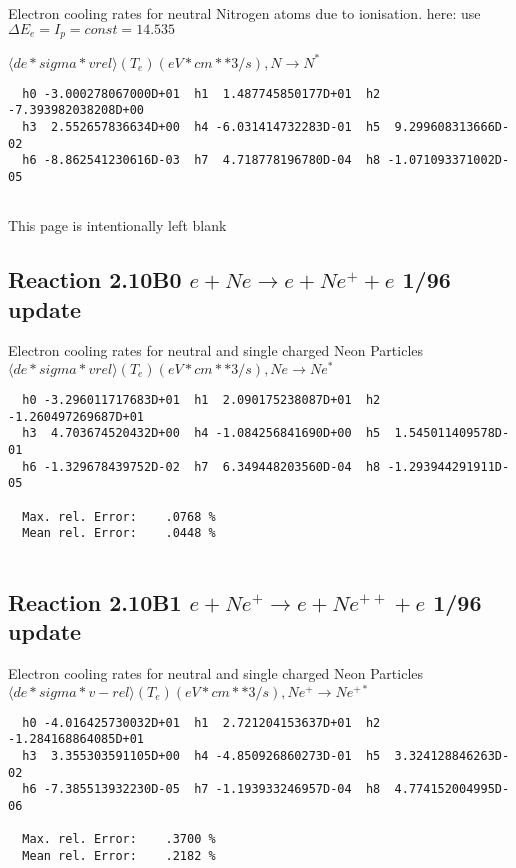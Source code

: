 \documentclass[12pt,dvipdfmx]{article}
\begin{document}
 Electron cooling rates for neutral Nitrogen atoms due to ionisation.
 here: use $\Delta E_e = I_p = const = 14.535$



 $ \langle de*sigma*vrel \rangle(T_e)  (eV*cm**3/s), N \rightarrow N^{*} $


\begin{small}\begin{verbatim}
  h0 -3.000278067000D+01  h1  1.487745850177D+01  h2 -7.393982038208D+00
  h3  2.552657836634D+00  h4 -6.031414732283D-01  h5  9.299608313666D-02
  h6 -8.862541230616D-03  h7  4.718778196780D-04  h8 -1.071093371002D-05


\end{verbatim}\end{small}

\newpage
This page is intentionally left blank
\newpage


\subsection{
Reaction 2.10B0 $e + Ne \rightarrow e + Ne^+ + e  $ 1/96 update
}

  Electron cooling rates for neutral and single
  charged Neon Particles
 $ \langle de*sigma*vrel \rangle(T_e)  (eV*cm**3/s), Ne  \rightarrow  Ne^*$

\begin{small}\begin{verbatim}
  h0 -3.296011717683D+01  h1  2.090175238087D+01  h2 -1.260497269687D+01
  h3  4.703674520432D+00  h4 -1.084256841690D+00  h5  1.545011409578D-01
  h6 -1.329678439752D-02  h7  6.349448203560D-04  h8 -1.293944291911D-05

  Max. rel. Error:    .0768 %
  Mean rel. Error:    .0448 %


\end{verbatim}\end{small}


\subsection{
Reaction 2.10B1 $ e + Ne^+ \rightarrow e + Ne^{++} + e $ 1/96 update
}

  Electron cooling rates for neutral and single
  charged Neon Particles
 $  \langle de*sigma*v-rel \rangle(T_e)  (eV*cm**3/s), Ne^+ \rightarrow Ne^{+*} $

\begin{small}\begin{verbatim}
  h0 -4.016425730032D+01  h1  2.721204153637D+01  h2 -1.284168864085D+01
  h3  3.355303591105D+00  h4 -4.850926860273D-01  h5  3.324128846263D-02
  h6 -7.385513932230D-05  h7 -1.193933246957D-04  h8  4.774152004995D-06

  Max. rel. Error:    .3700 %
  Mean rel. Error:    .2182 %

\end{verbatim}\end{small}
\end{document}
